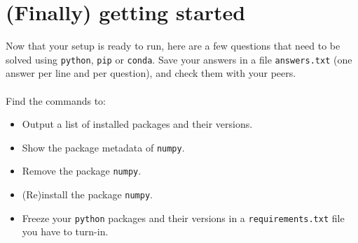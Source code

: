 \section*{(Finally) getting started}

Now that your setup is ready to run, here are a few questions that need to be solved using \texttt{python}, \texttt{pip} or \texttt{conda}. Save your answers in a file \texttt{answers.txt} (one answer per line and per question), and check them with your peers.\\\\
Find the commands to:
\begin{itemize}
	\item Output a list of installed packages and their versions.
	\item Show the package metadata of \texttt{numpy}.
	\item Remove the package \texttt{numpy}.
	\item (Re)install the package \texttt{numpy}.
	\item Freeze your \texttt{python} packages and their versions in a \texttt{requirements.txt} file you have to turn-in.
\end{itemize}


